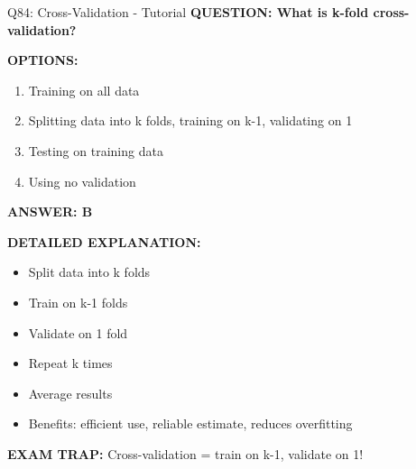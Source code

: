 \documentclass[8pt]{beamer}
\begin{document}
	\begin{frame}{Q84: Cross-Validation - Tutorial}
		\fontsize{6.5}{7.5}\selectfont
		\textbf{QUESTION: What is k-fold cross-validation?}
		
		\vspace{0.1cm}
		\textbf{OPTIONS:}
		\begin{enumerate}
			\item Training on all data
			\item Splitting data into k folds, training on k-1, validating on 1
			\item Testing on training data
			\item Using no validation
		\end{enumerate}
		
		\vspace{0.1cm}
		\textcolor{myblue}{\textbf{ANSWER: B}}
		
		\vspace{0.1cm}
		\textbf{DETAILED EXPLANATION:}
		\begin{itemize}
			\item Split data into k folds
			\item Train on k-1 folds
			\item Validate on 1 fold
			\item Repeat k times
			\item Average results
			\item Benefits: efficient use, reliable estimate, reduces overfitting
		\end{itemize}
		
		\vspace{0.1cm}
		\textcolor{myred}{\textbf{EXAM TRAP:}} Cross-validation = \textcolor{myblue}{train on k-1, validate on 1}!
	\end{frame}
	
\end{document}

